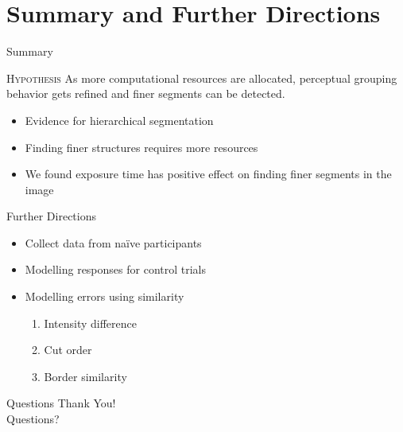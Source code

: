 \documentclass[10pt,xcolor=svgnames]{beamer} %
\begin{document}
\section{Summary and Further Directions}
\begin{frame}{Summary}
    \begin{exampleblock}{\textsc{Hypothesis}}
        As more computational resources are allocated, perceptual grouping behavior gets refined and finer segments can be detected.
    \end{exampleblock}

    \begin{itemize}
        \item Evidence for hierarchical segmentation
        \item Finding finer structures requires more resources
        \item We found exposure time has positive effect on finding finer segments in the image
    \end{itemize}
\end{frame}

\begin{frame}{Further Directions}
    \begin{itemize}
        \item Collect data from naïve participants
        \item Modelling responses for control trials
        \item Modelling errors using similarity
        \begin{enumerate}
            \item Intensity difference
            \item Cut order
            \item Border similarity
        \end{enumerate}
    \end{itemize}
\end{frame}


\begin{frame}{Questions}
    \centering
    \huge Thank You! \\
    \huge Questions?
\end{frame}
\end{document}
